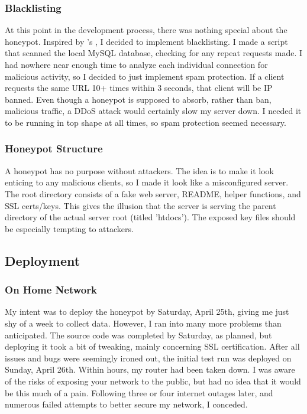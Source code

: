 \documentclass[12pt]{article}
\begin{document}
\subsubsection{Blacklisting}
At this point in the development process, there was nothing special about the honeypot.
Inspired by \textcite{stackhoneypot}'s , I decided to implement blacklisting.
I made a script that scanned the local MySQL database, checking for any repeat requests made.
I had nowhere near enough time to analyze each individual connection for malicious activity, so I decided to just implement spam protection.
If a client requests the same URL 10+ times within 3 seconds, that client will be IP banned.
Even though a honeypot is supposed to absorb, rather than ban, malicious traffic, a DDoS attack would certainly slow my server down.
I needed it to be running in top shape at all times, so spam protection seemed necessary.

\subsubsection{Honeypot Structure}
A honeypot has no purpose without attackers.
The idea is to make it look enticing to any malicious clients, so I made it look like a misconfigured server.
The root directory consists of a fake web server, README, helper functions, and SSL certs/keys.
This gives the illusion that the server is serving the parent directory of the actual server root (titled 'htdocs').
The exposed key files should be especially tempting to attackers.

\subsection{Deployment}

\subsubsection{On Home Network}
My intent was to deploy the honeypot by Saturday, April 25th, giving me just shy of a week to collect data.
However, I ran into many more problems than anticipated.
The source code was completed by Saturday, as planned, but deploying it took a bit of tweaking, mainly concerning SSL certification.
After all issues and bugs were seemingly ironed out, the initial test run was deployed on Sunday, April 26th.
Within hours, my router had been taken down.
I was aware of the risks of exposing your network to the public, but had no idea that it would be this much of a pain.
Following three or four internet outages later, and numerous failed attempts to better secure my network, I conceded.
\end{document}
